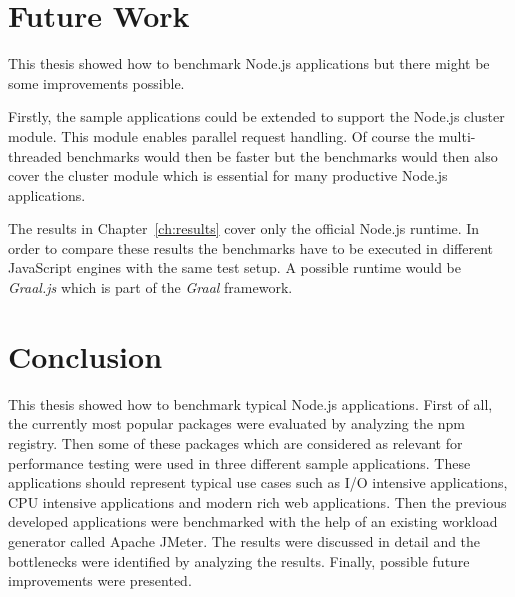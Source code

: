 \chapter{Future Work}
\label{ch:future-work}
This thesis showed how to benchmark Node.js applications but there might be some improvements possible. 

Firstly, the sample applications could be extended to support the Node.js cluster module. This module enables parallel request handling. Of course the multi-threaded benchmarks would then be faster but the benchmarks would then also cover the cluster module which is essential for many productive Node.js applications.

The results in Chapter~\ref{ch:results} cover only the official Node.js runtime. In order to compare these results the benchmarks have to be executed in different JavaScript engines with the same test setup. A possible runtime would be \textit{Graal.js} which is part of the \textit{Graal} framework\cite{graal}.



\chapter{Conclusion}

This thesis showed how to benchmark typical Node.js applications. First of all, the currently most popular packages were evaluated by analyzing the npm registry. Then some of these packages which are considered as relevant for performance testing were used in three different sample applications. These applications should represent typical use cases such as I/O intensive applications, CPU intensive applications and modern rich web applications. Then the previous developed applications were benchmarked with the help of an existing workload generator called Apache JMeter. The results were discussed in detail and the bottlenecks were identified by analyzing the results. Finally, possible future improvements were presented.



\appendix

\listoffigures
\listoftables





